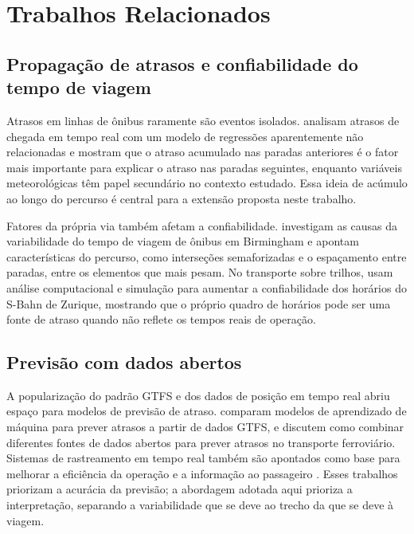 \section{Trabalhos Relacionados}
\label{sec:relacionados}

\subsection{Propagação de atrasos e confiabilidade do tempo de viagem}

Atrasos em linhas de ônibus raramente são eventos isolados. \cite{Zhang2024} analisam atrasos de chegada em tempo real com um modelo de regressões
aparentemente não relacionadas e mostram que o atraso acumulado nas paradas anteriores é o
fator mais importante para explicar o atraso nas paradas seguintes, enquanto variáveis
meteorológicas têm papel secundário no contexto estudado. Essa ideia de acúmulo ao longo do
percurso é central para a extensão proposta neste trabalho.

Fatores da própria via também afetam a confiabilidade. \cite{KAEWUNRUEN2021100280} investigam as causas da variabilidade do tempo de viagem de
ônibus em Birmingham e apontam características do percurso, como interseções semaforizadas e
o espaçamento entre paradas, entre os elementos que mais pesam. No transporte sobre trilhos,
\cite{doi:10.1177/0361198106195500103} usam
análise computacional e simulação para aumentar a confiabilidade dos horários do S-Bahn de
Zurique, mostrando que o próprio quadro de horários pode ser uma fonte de atraso quando não
reflete os tempos reais de operação.

\subsection{Previsão com dados abertos}

A popularização do padrão GTFS e dos dados de posição em tempo real abriu espaço para modelos
de previsão de atraso. \cite{10857111} comparam modelos de
aprendizado de máquina para prever atrasos a partir de dados GTFS, e
\cite{SARHANI2024100120} discutem como combinar diferentes
fontes de dados abertos para prever atrasos no transporte ferroviário. Sistemas de
rastreamento em tempo real também são apontados como base para melhorar a eficiência da
operação e a informação ao passageiro \cite{10544098}. Esses trabalhos priorizam a acurácia da
previsão; a abordagem adotada aqui prioriza a interpretação, separando a variabilidade que se
deve ao trecho da que se deve à viagem.

